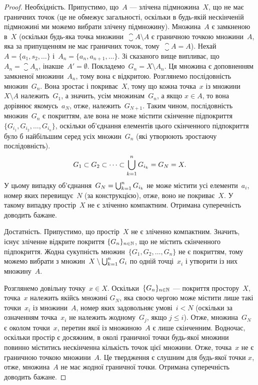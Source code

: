 \begin{proof}
Необхідність. Припустимо, що~$A$ ---
злічена підмножина~$X$, що не має граничних точок (це не
обмежує загальності, оскільки в будь-якій нескінченій
підмножині ми можемо вибрати злічену підмножину).
Множина~$A$ є замкненою в~$X$ (оскільки будь-яка точка
множини~$\closure A \setminus A$ є граничною точкою множини~$A$, яка за
припущенням не має граничних точок, тому~$\closure A = A$). Нехай
$A = \{a_1, s_2, \dots\}$ і~$A_n = \{a_n, a_{n + 1}, \dots\}$.
Зі сказаного вище випливає,
що~$A_n = \closure A_n$, інакше~$A' = \emptyset$.
Покладемо~$G_n = X \setminus A_n$. Ця
множина є доповненням замкненої множини~$A_n$, тому вона
є відкритою. Розглянемо послідовність множин~$G_n$. Вона
зростає і покриває~$X$, тому що кожна точка~$x$ із множини
$X \setminus A$ належить~$G_1$, а значить, усім множинам~$G_n$, а якщо
$x \in A$, то вона дорівнює якомусь~$a_N$, отже, належить~$G_{N + 1}$.
Таким чином, послідовність множин~$G_n$ є покриттям, але
вона не може містити скінченне підпокриття
$\{G_{i_1}, G_{i_2}, \dots, G_{i_n}\}$,
оскільки об’єднання елементів цього
скінченного підпокриття було б найбільшим серед усіх
множин~$G_n$ (які утворюють зростаючу послідовність).
\begin{equation*}
G_1 \subset G_2 \subset \dots \subset \operatorname*{\bigcup}_{k = 1}^n G_{i_k} = G_N = X.
\end{equation*}
У цьому випадку об’єднання~$G_N = \operatorname*{\bigcup}_{k = 1}^n G_{i_k}$
не може містити
усі елементи~$a_i$, номер яких перевищує~$N$ (за
конструкцією), отже, воно не покриває~$X$. У такому
випадку простір~$X$ не є зліченно компактним. Отримана
суперечність доводить бажане.

Достатність. Припустимо, що простір~$X$ не є зліченно
компактним. Значить, існує зліченне відкрите покриття
$\{G_n\}_{n \in \mathbb{N}}$, що не містить скінченного підпокриття.
Жодна сукупність множин~$\{G_1, G_2, \dots, G_n\}$ не є покриттям,
тому можемо вибрати з множин~$X \setminus \operatorname*{\bigcup}_{k = 1}^n G_i$
по одній точці~$x_i$ і утворити із них множину~$A$.

Розглянемо довільну точку~$x \in X$. Оскільки~$\{G_n\}_{n \in \mathbb{N}}$ ---
покриття простору~$X$, точка~$x$ належить якійсь множині
$G_N$, яка своєю чергою може містити лише такі точки~$x_i$ із
множини~$A$, номер яких задовольняє умові~$i < N$ (оскільки
за означенням точка~$x_i$ не належить жодному~$G_j$, якщо
$j \le i$). Отже, множина~$G_N$ є околом точки~$x$, перетин якої
із множиною~$A$ є лише скінченним. Водночас, оскільки
простір є досяжним, в околі граничної точки будь-якої
множини повинно міститись нескінченна кількість точок
цієї множини. Отже, точка~$x$ не є граничною точкою
множини~$A$. Це твердження є слушним для будь-якої точки
$x$, отже, множина~$A$ не має жодної граничної точки.
Отримана суперечність доводить бажане.
\end{proof}

